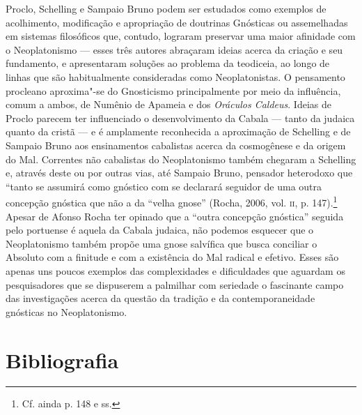 Proclo, Schelling e Sampaio Bruno podem ser estudados como
exemplos de acolhimento, modificação e apropriação de doutrinas
Gnósticas ou assemelhadas em sistemas filosóficos que, contudo,
lograram preservar uma maior afinidade com o Neoplatonismo ---
esses três autores abraçaram ideias acerca da criação e seu
fundamento, e apresentaram soluções ao problema da teodiceia, ao
longo de linhas que são habitualmente consideradas como
Neoplatonistas. O pensamento procleano aproxima"-se do
Gnosticismo principalmente por meio da influência, comum a
ambos, de Numênio de Apameia e dos \emph{Oráculos Caldeus}.
Ideias de Proclo parecem ter influenciado o desenvolvimento da
Cabala --- tanto da judaica quanto da cristã --- e é amplamente
reconhecida a aproximação de Schelling e de Sampaio Bruno aos
ensinamentos cabalistas acerca da cosmogênese e da origem do
Mal. Correntes não cabalistas do Neoplatonismo também chegaram a
Schelling e, através deste ou por outras vias, até Sampaio
Bruno, pensador heterodoxo que “tanto se assumirá como gnóstico
com se declarará seguidor de uma outra concepção gnóstica que
não a da ``velha gnose'' (Rocha, 2006, vol. \textsc{ii}, p. 147).\footnote{
Cf. ainda p. 148 e ss.} Apesar de Afonso Rocha ter opinado que
a “outra concepção gnóstica” seguida pelo portuense é aquela da
Cabala judaica, não podemos esquecer que o Neoplatonismo também
propõe uma gnose salvífica que busca conciliar o Absoluto com a
finitude e com a existência do Mal radical e efetivo. Esses são
apenas uns poucos exemplos das complexidades e dificuldades que
aguardam os pesquisadores que se dispuserem a palmilhar com
seriedade o fascinante campo das investigações acerca da questão
da tradição e da contemporaneidade gnósticas no Neoplatonismo.


\section{Bibliografia}

